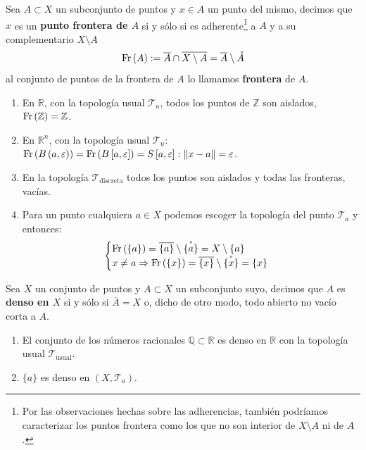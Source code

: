 \begin{defi}[Frontera]
Sea $A\subset X$ un subconjunto de puntos y $x\in A$ un punto del mismo, decimos que $x$ es un \textbf{punto frontera de $A$} si y sólo si es adherente\footnote{Por las observaciones hechas sobre las adherencias, también podríamos caracterizar los puntos frontera como los que no son interior de $X \setminus A$ ni de $A$.} a $A$ y a su complementario $X \setminus A$
    \[
    \operatorname{Fr}\left( A \right) := \overline{A} \cap \overline{X \setminus A} = \overline{A} \setminus \mathring{A}     
    \]
al conjunto de puntos de la frontera de $A$ lo llamamos \textbf{frontera} de $A$.
\end{defi}

\begin{ej}
\begin{enumerate}
    \item En $\mathbb{R}$, con la topología usual $\mathcal{T}_u$, todos los puntos de $\mathbb{Z}$ son aislados, $\operatorname{Fr}\left( \mathbb{Z} \right) = \mathbb{Z}$.
    \item En $\mathbb{R}^n$, con la topología usual $\mathcal{T}_u$: $\operatorname{Fr}\left( B\left( a, \varepsilon \right) \right) = \operatorname{Fr}\left( B\left[ a, \varepsilon \right] \right) = S\left[ a, \varepsilon \right] : \lVert x - a \rVert = \varepsilon$.
    \item En la topología $\mathcal{T}_{\text{discreta}}$ todos los puntos son aislados y todas las fronteras, vacías.
    \item Para un punto cualquiera $a \in X$ podemos escoger la topología del punto $\mathcal{T}_a$ y entonces:
$$
\begin{cases}
	\operatorname{Fr}\left( \{a\} \right) = \overline{\{a\}} \setminus \mathring{\{a\}} = X \setminus \{a\} \\
    x \neq a \Rightarrow \operatorname{Fr}\left( \{x\} \right) = \overline{\{x\}} \setminus \mathring{\{x\}} = \{x\} 
\end{cases} 
$$
\end{enumerate}
\end{ej}

\begin{defi}[Densidad]
Sea $X$ un conjunto de puntos y $A \subset X$ un subconjunto suyo, decimos que $A$ es \textbf{denso en $X$} si y sólo si $\overline{A} = X$ o, dicho de otro modo, todo abierto no vacío corta a $A$.
\end{defi}

\begin{ej}
\begin{enumerate}
    \item El conjunto de los números racionales $\mathbb{Q} \subset \mathbb{R}$ es denso en $\mathbb{R}$ con la topología usual $\mathcal{T}_{\text{usual}}$.
    \item $\{a\}$ es denso en $\left( X, \mathcal{T}_a \right)$.
\end{enumerate}
\end{ej}

